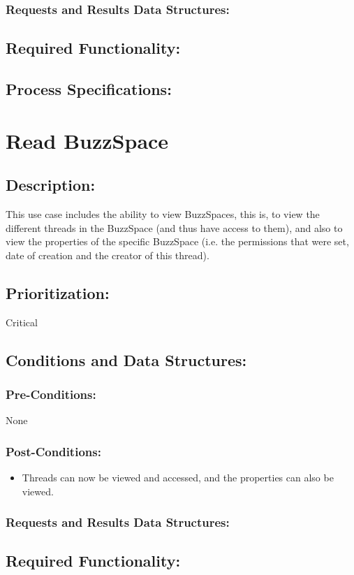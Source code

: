 \documentclass[a4paper,11pt]{article}
\begin{document}
\subsubsection*{Requests and Results Data Structures:}
\subsection{Required Functionality:} 
\subsection{Process Specifications:} 

\section{Read BuzzSpace}
\subsection*{Description:}This use case includes the ability to view BuzzSpaces, this is, to view the different threads in the BuzzSpace (and thus have access to them), and also to view the
properties of the specific BuzzSpace (i.e. the permissions that were set, date of creation and the creator of this thread).
\subsection{Prioritization:} Critical
\subsection{Conditions and Data Structures:}
\subsubsection*{Pre-Conditions:}None 
\subsubsection*{Post-Conditions:}
\begin{itemize}
	\item Threads can now be viewed and accessed, and the properties can also be viewed.
\end{itemize}
\subsubsection*{Requests and Results Data Structures:}
\subsection{Required Functionality:} 
\end{document}
